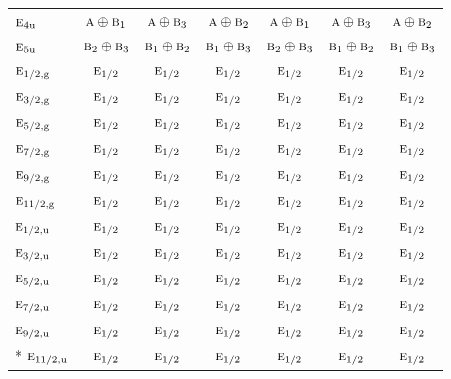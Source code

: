 \documentclass[10pt,a4paper]{article}
\numberwithin{equation}{section}
\newcommand{\irr}[1]{\text{\normalfont\scshape #1}}
\newcommand{\ptag}[1]{\mathrm{#1}}
\begin{document}
{\begin{longtable}{@{}lcccccc@{}}
$\irr{e}_{4\ptag{u}}$ & $\irr{a}\oplus \irr{b}_{1}$ & $\irr{a}\oplus \irr{b}_{3}$ & $\irr{a}\oplus \irr{b}_{2}$ & $\irr{a}\oplus \irr{b}_{1}$ & $\irr{a}\oplus \irr{b}_{3}$ & $\irr{a}\oplus \irr{b}_{2}$\\
$\irr{e}_{5\ptag{u}}$ & $\irr{b}_{2}\oplus \irr{b}_{3}$ & $\irr{b}_{1}\oplus \irr{b}_{2}$ & $\irr{b}_{1}\oplus \irr{b}_{3}$ & $\irr{b}_{2}\oplus \irr{b}_{3}$ & $\irr{b}_{1}\oplus \irr{b}_{2}$ & $\irr{b}_{1}\oplus \irr{b}_{3}$\\
$\irr{e}_{1/2,\ptag{g}}$ & $\irr{e}_{1/2}$ & $\irr{e}_{1/2}$ & $\irr{e}_{1/2}$ & $\irr{e}_{1/2}$ & $\irr{e}_{1/2}$ & $\irr{e}_{1/2}$\\
$\irr{e}_{3/2,\ptag{g}}$ & $\irr{e}_{1/2}$ & $\irr{e}_{1/2}$ & $\irr{e}_{1/2}$ & $\irr{e}_{1/2}$ & $\irr{e}_{1/2}$ & $\irr{e}_{1/2}$\\
$\irr{e}_{5/2,\ptag{g}}$ & $\irr{e}_{1/2}$ & $\irr{e}_{1/2}$ & $\irr{e}_{1/2}$ & $\irr{e}_{1/2}$ & $\irr{e}_{1/2}$ & $\irr{e}_{1/2}$\\
$\irr{e}_{7/2,\ptag{g}}$ & $\irr{e}_{1/2}$ & $\irr{e}_{1/2}$ & $\irr{e}_{1/2}$ & $\irr{e}_{1/2}$ & $\irr{e}_{1/2}$ & $\irr{e}_{1/2}$\\
$\irr{e}_{9/2,\ptag{g}}$ & $\irr{e}_{1/2}$ & $\irr{e}_{1/2}$ & $\irr{e}_{1/2}$ & $\irr{e}_{1/2}$ & $\irr{e}_{1/2}$ & $\irr{e}_{1/2}$\\
$\irr{e}_{11/2,\ptag{g}}$ & $\irr{e}_{1/2}$ & $\irr{e}_{1/2}$ & $\irr{e}_{1/2}$ & $\irr{e}_{1/2}$ & $\irr{e}_{1/2}$ & $\irr{e}_{1/2}$\\
$\irr{e}_{1/2,\ptag{u}}$ & $\irr{e}_{1/2}$ & $\irr{e}_{1/2}$ & $\irr{e}_{1/2}$ & $\irr{e}_{1/2}$ & $\irr{e}_{1/2}$ & $\irr{e}_{1/2}$\\
$\irr{e}_{3/2,\ptag{u}}$ & $\irr{e}_{1/2}$ & $\irr{e}_{1/2}$ & $\irr{e}_{1/2}$ & $\irr{e}_{1/2}$ & $\irr{e}_{1/2}$ & $\irr{e}_{1/2}$\\
$\irr{e}_{5/2,\ptag{u}}$ & $\irr{e}_{1/2}$ & $\irr{e}_{1/2}$ & $\irr{e}_{1/2}$ & $\irr{e}_{1/2}$ & $\irr{e}_{1/2}$ & $\irr{e}_{1/2}$\\
$\irr{e}_{7/2,\ptag{u}}$ & $\irr{e}_{1/2}$ & $\irr{e}_{1/2}$ & $\irr{e}_{1/2}$ & $\irr{e}_{1/2}$ & $\irr{e}_{1/2}$ & $\irr{e}_{1/2}$\\
$\irr{e}_{9/2,\ptag{u}}$ & $\irr{e}_{1/2}$ & $\irr{e}_{1/2}$ & $\irr{e}_{1/2}$ & $\irr{e}_{1/2}$ & $\irr{e}_{1/2}$ & $\irr{e}_{1/2}$\\*
$\irr{e}_{11/2,\ptag{u}}$ & $\irr{e}_{1/2}$ & $\irr{e}_{1/2}$ & $\irr{e}_{1/2}$ & $\irr{e}_{1/2}$ & $\irr{e}_{1/2}$ & $\irr{e}_{1/2}$\\
\bottomrule\end{longtable}}
\end{document}
